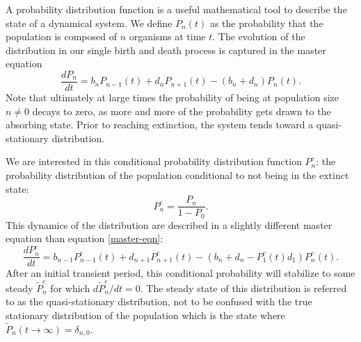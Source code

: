 A probability distribution function is a useful mathematical tool to describe the state of a dynamical system.
We define $P_n(t)$ as the probability that the population is composed of $n$ organisms at time $t$.
The evolution of the distribution in our single birth and death process is captured in the master equation
\begin{equation}
\frac{dP_n}{dt} =  b_n P_{n-1}(t) + d_n P_{n+1}(t) - (b_n+d_n)P_n(t).
\label{master-eqn}
\end{equation}
Note that ultimately at large times the probability of being at population size $n\neq 0$ decays to zero, as more and more of the probability gets drawn to the absorbing state.
Prior to reaching extinction, the system tends toward a quasi-stationary distribution.

We are interested in this conditional probability distribution function $P_n^c$: the probability distribution of the population conditional to not being in the extinct state: %
\begin{equation*}
P_n^c = \frac{P_n}{1-P_0}.
\end{equation*}
This dynamics of the distribution are described in a slightly different master equation than equation \ref{master-eqn}:
\begin{equation}
\frac{dP_n^c}{dt} =  b_{n-1}P_{n-1}^c(t) + d_{n+1}P_{n+1}^c(t) - (b_n + d_n - P_1^c(t)d_1)P_n^c(t).
\label{masters2}
\end{equation}
After an initial transient period, this conditional probability will stabilize to some steady $\tilde{P}^c_n$ for which $d\tilde{P}_n^c/dt=0$.
The steady state of this distribution is referred to as the quasi-stationary distribution, not to be confused with the true stationary distribution of the population which is the state where $\tilde{P}_n(t \rightarrow \infty)=\delta_{n,0}$.


